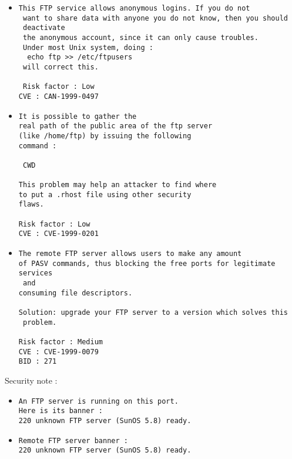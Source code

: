 \documentclass{article}
\begin{document}
\begin{itemize}
\item \begin{verbatim}
This FTP service allows anonymous logins. If you do not
 want to share data with anyone you do not know, then you should
 deactivate
 the anonymous account, since it can only cause troubles.
 Under most Unix system, doing : 
  echo ftp >> /etc/ftpusers
 will correct this.
 
 Risk factor : Low
CVE : CAN-1999-0497
\end{verbatim}\item \begin{verbatim}
It is possible to gather the
real path of the public area of the ftp server
(like /home/ftp) by issuing the following
command :

 CWD
 
This problem may help an attacker to find where
to put a .rhost file using other security
flaws.

Risk factor : Low
CVE : CVE-1999-0201
\end{verbatim}\item \begin{verbatim}
The remote FTP server allows users to make any amount
of PASV commands, thus blocking the free ports for legitimate services
 and
consuming file descriptors.

Solution: upgrade your FTP server to a version which solves this
 problem.

Risk factor : Medium
CVE : CVE-1999-0079
BID : 271
\end{verbatim}\end{itemize}
Security note :\\
\begin{itemize}
\item \begin{verbatim}
An FTP server is running on this port.
Here is its banner : 
220 unknown FTP server (SunOS 5.8) ready.
\end{verbatim}\item \begin{verbatim}
Remote FTP server banner :
220 unknown FTP server (SunOS 5.8) ready.
\end{verbatim}\end{itemize}
\end{document}
